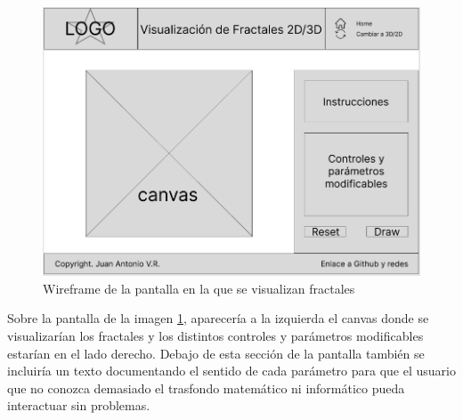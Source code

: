 \begin{figure} [ht]
\centering
\includegraphics[scale = 0.4]{img/wireframe-1.png}
\caption{Wireframe de la pantalla en la que se visualizan fractales}
    \label{fig:wireframe-fractals}
\end{figure}

Sobre la pantalla de la imagen \ref{fig:wireframe-fractals}, aparecería a la izquierda el canvas donde se visualizarían los fractales y los distintos controles y parámetros modificables estarían en el lado derecho. Debajo de esta sección de la pantalla también se incluiría un texto documentando el sentido de cada parámetro para que el usuario que no conozca demasiado el trasfondo matemático ni informático pueda interactuar sin problemas.
